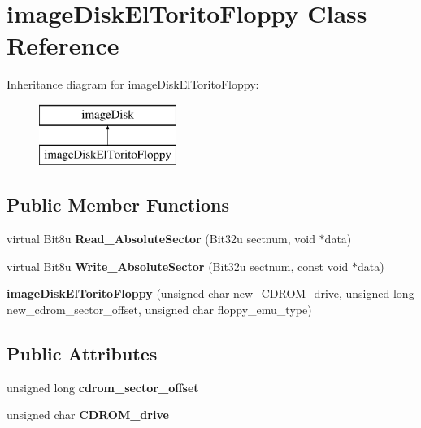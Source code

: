 \hypertarget{classimageDiskElToritoFloppy}{\section{image\-Disk\-El\-Torito\-Floppy Class Reference}
\label{classimageDiskElToritoFloppy}
}
Inheritance diagram for image\-Disk\-El\-Torito\-Floppy\-:\begin{figure}[H]
\begin{center}
\leavevmode
\includegraphics[height=2.000000cm]{classimageDiskElToritoFloppy}
\end{center}
\end{figure}
\subsection*{Public Member Functions}
\begin{DoxyCompactItemize}
\item 
\hypertarget{classimageDiskElToritoFloppy_ade907456a3ce92d9c0404318c8b35101}{virtual Bit8u {\bfseries Read\-\_\-\-Absolute\-Sector} (Bit32u sectnum, void $\ast$data)}\label{classimageDiskElToritoFloppy_ade907456a3ce92d9c0404318c8b35101}

\item 
\hypertarget{classimageDiskElToritoFloppy_a0fbacff607a52cbc3623dcc43efacb77}{virtual Bit8u {\bfseries Write\-\_\-\-Absolute\-Sector} (Bit32u sectnum, const void $\ast$data)}\label{classimageDiskElToritoFloppy_a0fbacff607a52cbc3623dcc43efacb77}

\item 
\hypertarget{classimageDiskElToritoFloppy_a325a3fe334dc15dbf973da1c878bfa60}{{\bfseries image\-Disk\-El\-Torito\-Floppy} (unsigned char new\-\_\-\-C\-D\-R\-O\-M\-\_\-drive, unsigned long new\-\_\-cdrom\-\_\-sector\-\_\-offset, unsigned char floppy\-\_\-emu\-\_\-type)}\label{classimageDiskElToritoFloppy_a325a3fe334dc15dbf973da1c878bfa60}

\end{DoxyCompactItemize}
\subsection*{Public Attributes}
\begin{DoxyCompactItemize}
\item 
\hypertarget{classimageDiskElToritoFloppy_a547663fbe00597d9e53372a59e1fb508}{unsigned long {\bfseries cdrom\-\_\-sector\-\_\-offset}}\label{classimageDiskElToritoFloppy_a547663fbe00597d9e53372a59e1fb508}

\item 
\hypertarget{classimageDiskElToritoFloppy_af7bff4119ea850b3181ce7af0b47a879}{unsigned char {\bfseries C\-D\-R\-O\-M\-\_\-drive}}\label{classimageDiskElToritoFloppy_af7bff4119ea850b3181ce7af0b47a879}

\end{DoxyCompactItemize}



